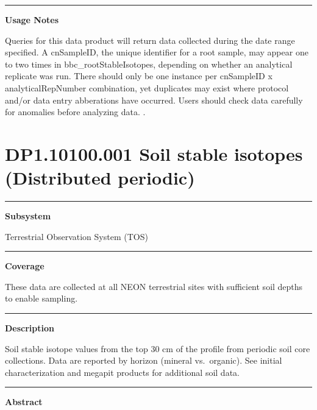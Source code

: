 \documentclass[]{article}
\begin{document}
\begin{center}\rule{0.5\linewidth}{\linethickness}\end{center}

\textbf{Usage Notes}

Queries for this data product will return data collected during the date
range specified. A cnSampleID, the unique identifier for a root sample,
may appear one to two times in bbc\_rootStableIsotopes, depending on
whether an analytical replicate was run. There should only be one
instance per cnSampleID x analyticalRepNumber combination, yet
duplicates may exist where protocol and/or data entry abberations have
occurred. Users should check data carefully for anomalies before
analyzing data. \newpage
.

\section{DP1.10100.001 Soil stable isotopes (Distributed
periodic)}\label{dp1.10100.001-soil-stable-isotopes-distributed-periodic}

\begin{center}\rule{0.5\linewidth}{\linethickness}\end{center}

\textbf{Subsystem}

Terrestrial Observation System (TOS)

\begin{center}\rule{0.5\linewidth}{\linethickness}\end{center}

\textbf{Coverage}

These data are collected at all NEON terrestrial sites with sufficient
soil depths to enable sampling.

\begin{center}\rule{0.5\linewidth}{\linethickness}\end{center}

\textbf{Description}

Soil stable isotope values from the top 30 cm of the profile from
periodic soil core collections. Data are reported by horizon (mineral
vs.~organic). See initial characterization and megapit products for
additional soil data.

\begin{center}\rule{0.5\linewidth}{\linethickness}\end{center}

\textbf{Abstract}
\end{document}
